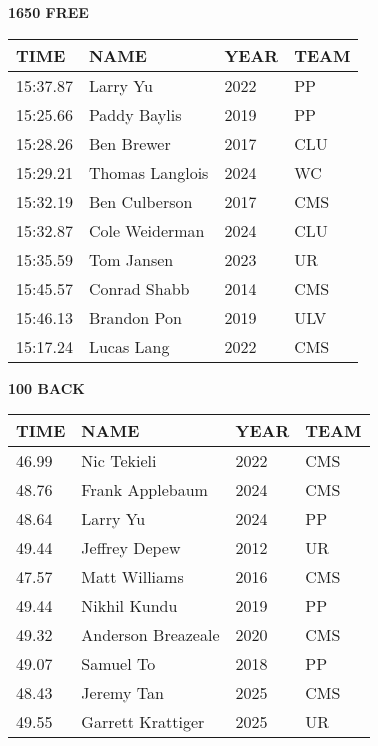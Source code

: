 \begin{minipage}[t]{0.48\textwidth}
\centering
\textbf{1650 FREE}\\[0.05cm]
\begin{tabular}{@{}p{1.8cm}p{2.8cm}p{1.2cm}p{1.4cm}@{}}
\hline
\textbf{TIME} & \textbf{NAME} & \textbf{YEAR} & \textbf{TEAM} \\
\hline
15:37.87 & Larry Yu & 2022 & PP \\
15:25.66 & Paddy Baylis & 2019 & PP \\
15:28.26 & Ben Brewer & 2017 & CLU \\
15:29.21 & Thomas Langlois & 2024 & WC \\
15:32.19 & Ben Culberson & 2017 & CMS \\
15:32.87 & Cole Weiderman & 2024 & CLU \\
15:35.59 & Tom Jansen & 2023 & UR \\
15:45.57 & Conrad Shabb & 2014 & CMS \\
15:46.13 & Brandon Pon & 2019 & ULV \\
15:17.24 & Lucas Lang & 2022 & CMS \\
\hline
\end{tabular}
\end{minipage}\hfill
\begin{minipage}[t]{0.48\textwidth}
\centering
\textbf{100 BACK}\\[0.05cm]
\begin{tabular}{@{}p{1.8cm}p{2.8cm}p{1.2cm}p{1.4cm}@{}}
\hline
\textbf{TIME} & \textbf{NAME} & \textbf{YEAR} & \textbf{TEAM} \\
\hline
46.99 & Nic Tekieli & 2022 & CMS \\
48.76 & Frank Applebaum & 2024 & CMS \\
48.64 & Larry Yu & 2024 & PP \\
49.44 & Jeffrey Depew & 2012 & UR \\
47.57 & Matt Williams & 2016 & CMS \\
49.44 & Nikhil Kundu & 2019 & PP \\
49.32 & Anderson Breazeale & 2020 & CMS \\
49.07 & Samuel To & 2018 & PP \\
48.43 & Jeremy Tan & 2025 & CMS \\
49.55 & Garrett Krattiger & 2025 & UR \\
\hline
\end{tabular}
\end{minipage}

\vspace{0.4cm}

